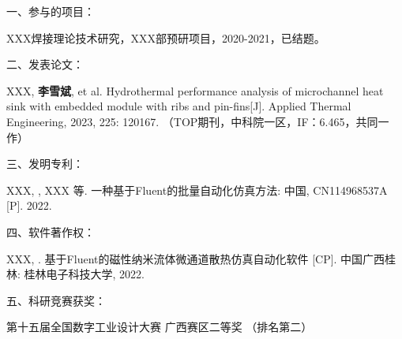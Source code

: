 
\noindent %
一、参与的项目：
\begingroup
\setlength{\itemsep}{0bp}\setlength{\parskip}{0pt}
    \begin{enumerate}[label={[\arabic*]}] %
        \item XXX焊接理论技术研究，XXX部预研项目，2020-2021，已结题。
        \end{enumerate}
\endgroup
\vspace{3mm}

\noindent %
二、发表论文：
\begingroup
\setlength{\itemsep}{0bp}\setlength{\parskip}{0pt}
    \begin{enumerate}[label={[\arabic*]}] 
        \item XXX, {\bfseries{李雪斌}}, et al. Hydrothermal performance analysis of microchannel heat sink with embedded module with ribs and pin-fins[J]. Applied Thermal Engineering, 2023, 225: 120167. （TOP期刊，中科院一区，IF：6.465，共同一作）
    \end{enumerate}
\endgroup
\vspace{3mm}

\noindent %
三、发明专利：
\begingroup
\setlength{\itemsep}{0bp}\setlength{\parskip}{0pt}
    \begin{enumerate}[label={[\arabic*]}]  
        \item XXX, , XXX 等. 一种基于Fluent的批量自动化仿真方法: 中国, CN114968537A [P]. 2022. 
    \end{enumerate}
\endgroup
\vspace{3mm}

\noindent %
四、软件著作权：
\begingroup
\setlength{\itemsep}{0bp}\setlength{\parskip}{0pt}
    \begin{enumerate}[label={[\arabic*]}]  
        \item XXX, . 基于Fluent的磁性纳米流体微通道散热仿真自动化软件 [CP]. 中国广西桂林: 桂林电子科技大学, 2022.
    \end{enumerate}
\endgroup
\vspace{3mm}

\noindent %
五、科研竞赛获奖：
\begingroup
    \setlength{\itemsep}{0bp}\setlength{\parskip}{0pt}
    \begin{enumerate}[label={[\arabic*]}]  
        \item 第十五届全国数字工业设计大赛 广西赛区二等奖 （排名第二）   
    \end{enumerate}
\endgroup


